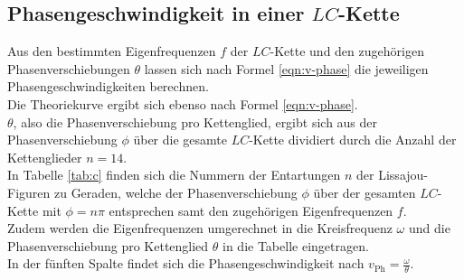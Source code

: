 \FloatBarrier
\subsection{Phasengeschwindigkeit in einer $LC$-Kette}

Aus den bestimmten Eigenfrequenzen $f$ der $LC$-Kette und den zugehörigen Phasenverschiebungen $\theta$ lassen sich nach Formel \eqref{eqn:v-phase} die jeweiligen Phasengeschwindigkeiten berechnen.\\
Die Theoriekurve ergibt sich ebenso nach Formel \eqref{eqn:v-phase}.\\
$\theta$, also die Phasenverschiebung pro Kettenglied, ergibt sich aus der Phasenverschiebung $\phi$ über die gesamte $LC$-Kette dividiert durch die Anzahl der Kettenglieder $n=14$.\\
In Tabelle \ref{tab:c} finden sich die Nummern der Entartungen $n$ der Lissajou-Figuren zu Geraden, welche der Phasenverschiebung $\phi$ über der gesamten $LC$-Kette mit $\phi=n\pi$ entsprechen samt den zugehörigen Eigenfrequenzen $f$.\\
Zudem werden die Eigenfrequenzen umgerechnet in die Kreisfrequenz $\omega$ und die Phasenverschiebung pro Kettenglied $\theta$ in die Tabelle eingetragen. \\
In der fünften Spalte findet sich die Phasengeschwindigkeit nach $v_{\mathrm{Ph}}=\frac{\omega}{\theta}$.

